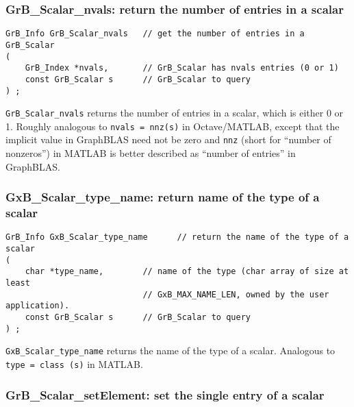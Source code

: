 \documentclass[12pt]{article}
\begin{document}
\subsubsection{{\sf GrB\_Scalar\_nvals:} return the number of entries in a scalar}
\label{scalar_nvals}

\begin{mdframed}[userdefinedwidth=6in]
{\footnotesize
\begin{verbatim}
GrB_Info GrB_Scalar_nvals   // get the number of entries in a GrB_Scalar
(
    GrB_Index *nvals,       // GrB_Scalar has nvals entries (0 or 1)
    const GrB_Scalar s      // GrB_Scalar to query
) ;
\end{verbatim}
} \end{mdframed}

\verb'GrB_Scalar_nvals' returns the number of entries in a scalar, which
is either 0 or 1.  Roughly analogous to \verb'nvals = nnz(s)' in Octave/MATLAB,
except that the implicit value in GraphBLAS need not be zero and \verb'nnz'
(short for ``number of nonzeros'') in MATLAB is better described as ``number of
entries'' in GraphBLAS.

\subsubsection{{\sf GxB\_Scalar\_type\_name:} return name of the type of a scalar}
\label{scalar_type_name}

\begin{mdframed}[userdefinedwidth=6in]
{\footnotesize
\begin{verbatim}
GrB_Info GxB_Scalar_type_name      // return the name of the type of a scalar
(
    char *type_name,        // name of the type (char array of size at least
                            // GxB_MAX_NAME_LEN, owned by the user application).
    const GrB_Scalar s      // GrB_Scalar to query
) ;
\end{verbatim}
} \end{mdframed}

\verb'GxB_Scalar_type_name' returns the name of the type of a scalar.
Analogous to \verb'type = class (s)' in MATLAB.

\newpage
\subsubsection{{\sf GrB\_Scalar\_setElement:} set the single entry of a scalar}
\label{scalar_setElement}
\end{document}
